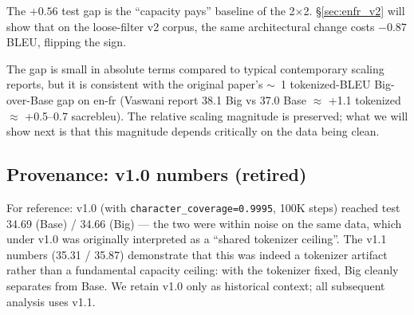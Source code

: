 The $+0.56$ test gap is the ``capacity pays'' baseline of the 2$\times$2. \S\ref{sec:enfr_v2} will show that on the loose-filter v2 corpus, the same architectural change costs $-0.87$ BLEU, flipping the sign.

The gap is small in absolute terms compared to typical contemporary scaling reports, but it is consistent with the original paper's $\sim$~1 tokenized-BLEU Big-over-Base gap on en-fr (Vaswani report 38.1 Big vs 37.0 Base $\approx$ +1.1 tokenized $\approx$ +0.5--0.7 sacrebleu). The relative scaling magnitude is preserved; what we will show next is that this magnitude depends critically on the data being clean.

\subsection{Provenance: v1.0 numbers (retired)}
For reference: v1.0 (with \texttt{character\_coverage=0.9995}, 100K steps) reached test 34.69 (Base) / 34.66 (Big) --- the two were within noise on the same data, which under v1.0 was originally interpreted as a ``shared tokenizer ceiling''. The v1.1 numbers (35.31 / 35.87) demonstrate that this was indeed a tokenizer artifact rather than a fundamental capacity ceiling: with the tokenizer fixed, Big cleanly separates from Base. We retain v1.0 only as historical context; all subsequent analysis uses v1.1.
